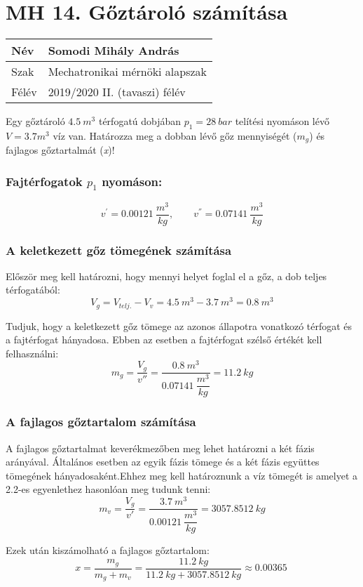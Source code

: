 \section*{MH 14. Gőztároló számítása}

\begin{tabular}{ | p{2cm} | p{14cm} | }
	\hline
	Név & Somodi Mihály András \\
	\hline
	Szak & Mechatronikai mérnöki alapszak \\
	\hline
	Félév & 2019/2020 II. (tavaszi) félév \\ 
	\hline
\end{tabular}

\vspace{0.5cm}

\noindent Egy gőztároló $\SI{4,5}{m^{3}} $ térfogatú dobjában $p_{1} = \SI{28}{bar}$ telítési nyomáson lévő $V =\SI{3,7}m^{3}$ víz van. Határozza meg a dobban lévő gőz mennyiségét ($m_{g}$) és fajlagos gőztartalmát (\textit{x})!

\subsubsection{Fajtérfogatok $p_{1}$ nyomáson:}
 \begin{equation*}
	 v^{'} =\SI{0,00121}{\dfrac{m^{3}}{kg}},
	 \qquad
	 v^{''} =\SI{0,07141}{\dfrac{m^{3}}{kg}}
\end{equation*}

\noindent\hrulefill

\subsubsection{A keletkezett gőz tömegének számítása}
Először meg kell határozni, hogy mennyi helyet foglal el a gőz, a dob teljes térfogatából:
\begin{equation}
	V_{g} = V_{telj.}-V_{v}
	= 
	\SI{4,5}{m^{3}}-\SI{3,7}{m^{3}} = \SI{0,8}{m^{3}}
\end{equation}

\noindent Tudjuk, hogy a keletkezett gőz tömege az azonos állapotra vonatkozó térfogat és a fajtérfogat hányadosa. Ebben az esetben a fajtérfogat szélső értékét kell felhasználni:
\begin{equation}
	m_{g} = \frac{V_{g}}{v''}
	=
    \frac{\SI{0,8}{m^{3}}}{\SI{0,07141}{\dfrac{m^{3}}{kg}}}
    = 
	\SI{11,2}{kg}
\end{equation}

\subsubsection{A fajlagos gőztartalom számítása}
A fajlagos gőztartalmat keverékmezőben meg lehet határozni a két fázis arányával. Általános esetben az egyik fázis tömege és a két fázis együttes tömegének hányadosaként.Ehhez meg kell határoznunk a víz tömegét is amelyet a 2.2-es egyenlethez hasonlóan meg tudunk tenni:
\begin{equation}
	m_{v} = \frac{V_{g}}{v'}
	=
	\frac{\SI{3,7}{m^{3}}}{\SI{0,00121}{\dfrac{m^{3}}{kg}}}
	= 
	\SI{3057,8512}{kg}
\end{equation}
 
\noindent Ezek után kiszámolható a fajlagos gőztartalom:
\begin{equation}
	x = \frac{m_{g}}{m_{g}+m_{v}}
	=
	\frac{\SI{11,2}{kg}}{\SI{11,2}{kg}+\SI{3057,8512}{kg}}
	\approx
	 \SI{0,00365}{}
\end{equation}
